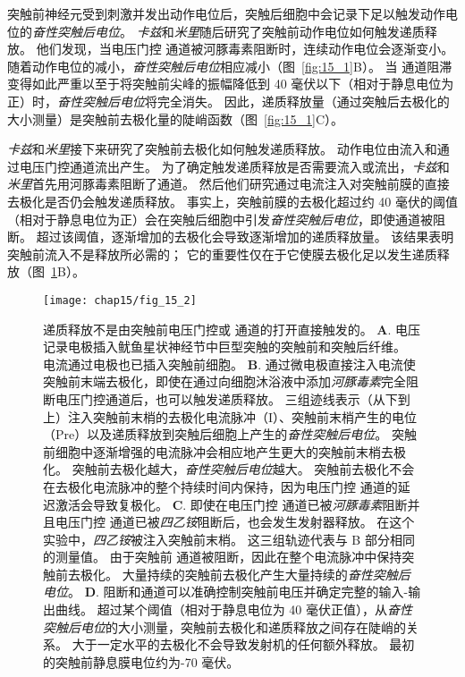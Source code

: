 突触前神经元受到刺激并发出动作电位后，突触后细胞中会记录下足以触发动作电位的\textit{奋性突触后电位}。
\textit{卡兹}和\textit{米里}随后研究了突触前动作电位如何触发递质释放。
他们发现，当电压门控  通道被河豚毒素阻断时，连续动作电位会逐渐变小。
随着动作电位的减小，\textit{奋性突触后电位}相应减小（图~\ref{fig:15_1}B）。
当  通道阻滞变得如此严重以至于将突触前尖峰的振幅降低到 40 毫伏以下（相对于静息电位为正）时，\textit{奋性突触后电位}将完全消失。
因此，递质释放量（通过突触后去极化的大小测量）是突触前去极化量的陡峭函数（图~\ref{fig:15_1}C）。


\textit{卡兹}和\textit{米里}接下来研究了突触前去极化如何触发递质释放。
动作电位由流入和通过电压门控通道流出产生。
为了确定触发递质释放是否需要流入或流出，\textit{卡兹}和\textit{米里}首先用河豚毒素阻断了通道。
然后他们研究通过电流注入对突触前膜的直接去极化是否仍会触发递质释放。
事实上，突触前膜的去极化超过约 40 毫伏的阈值（相对于静息电位为正）会在突触后细胞中引发\textit{奋性突触后电位}，即使通道被阻断。
超过该阈值，逐渐增加的去极化会导致逐渐增加的递质释放量。
该结果表明突触前流入不是释放所必需的；
它的重要性仅在于它使膜去极化足以发生递质释放（图~\ref{fig:15_2}B）。


\begin{figure}[htbp]
	\centering
	\texttt{[image: chap15/fig\_15\_2]}
	\caption{递质释放不是由突触前电压门控或  通道的打开直接触发的\cite{katz1967study}。
	\textbf{A}. 电压记录电极插入鱿鱼星状神经节中巨型突触的突触前和突触后纤维。
	电流通过电极也已插入突触前细胞。
	\textbf{B}. 通过微电极直接注入电流使突触前末端去极化，即使在通过向细胞沐浴液中添加\textit{河豚毒素}完全阻断电压门控通道后，也可以触发递质释放。
	三组迹线表示（从下到上）注入突触前末梢的去极化电流脉冲（I）、突触前末梢产生的电位（Pre）以及递质释放到突触后细胞上产生的\textit{奋性突触后电位}。
	突触前细胞中逐渐增强的电流脉冲会相应地产生更大的突触前末梢去极化。
	突触前去极化越大，\textit{奋性突触后电位}越大。
	突触前去极化不会在去极化电流脉冲的整个持续时间内保持，因为电压门控  通道的延迟激活会导致复极化。
	\textbf{C}. 即使在电压门控  通道已被\textit{河豚毒素}阻断并且电压门控  通道已被\textit{四乙铵}阻断后，也会发生发射器释放。
	在这个实验中，\textit{四乙铵}被注入突触前末梢。
	这三组轨迹代表与 B 部分相同的测量值。
	由于突触前  通道被阻断，因此在整个电流脉冲中保持突触前去极化。
	大量持续的突触前去极化产生大量持续的\textit{奋性突触后电位}。
	\textbf{D}. 阻断和通道可以准确控制突触前电压并确定完整的输入-输出曲线。
	超过某个阈值（相对于静息电位为 40 毫伏正值），从\textit{奋性突触后电位}的大小测量，突触前去极化和递质释放之间存在陡峭的关系。
	大于一定水平的去极化不会导致发射机的任何额外释放。
	最初的突触前静息膜电位约为-70 毫伏。}
	\label{fig:15_2}
\end{figure}


